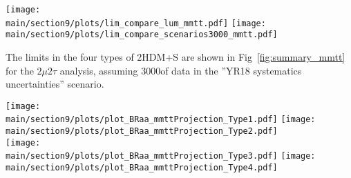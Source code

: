 \begin{figure*}[hbpt]
\centering
        \texttt{[image: \\main/section9/plots/lim\_compare\_lum\_mmtt.pdf]}
        \texttt{[image: \\main/section9/plots/lim\_compare\_scenarios3000\_mmtt.pdf]}\\
    \caption{Left: Projected expected limits on $(\sigma(h)/\sigma_{\textrm{SM}}) \mathcal{B}(h \to aa \to 2\mu 2\tau)$, for 36, 300, and 3000 fb$^{-1}$. Right: Projected expected limits on $(\sigma(h)/\sigma_{\textrm{SM}}) \mathcal{B}(h\to aa \to 2\mu2\tau)$, comparing different scenarios for systematic uncertainties for an integrated luminosity of 3000\fbinv.}
    \label{fig:mmtt_proj}
\end{figure*}

The limits in the four types of 2HDM+S are shown
in Fig~\ref{fig:summary_mmtt} for the $2\mu 2\tau$ analysis, assuming 3000\fbinv of data in the ''YR18 systematics uncertainties'' scenario.

\begin{figure*}[hbpt]
\centering
        \texttt{[image: \\main/section9/plots/plot\_BRaa\_mmttProjection\_Type1.pdf]}
        \texttt{[image: \\main/section9/plots/plot\_BRaa\_mmttProjection\_Type2.pdf]} \\
        \texttt{[image: \\main/section9/plots/plot\_BRaa\_mmttProjection\_Type3.pdf]}
        \texttt{[image: \\main/section9/plots/plot\_BRaa\_mmttProjection\_Type4.pdf]}
    \caption{Expected upper limits on $(\sigma(h)/\sigma_{\textrm{SM}})\mathcal{B}(h\to aa)$ for 3000\fbinv of data with YR18 systematic uncertainties for the $2\mu 2\tau$ final state in 2HDM+S type-1 (top left), type-2 (top right), type-3 (bottom left), and type-4 (bottom right).}
    \label{fig:summary_mmtt}
\end{figure*}


